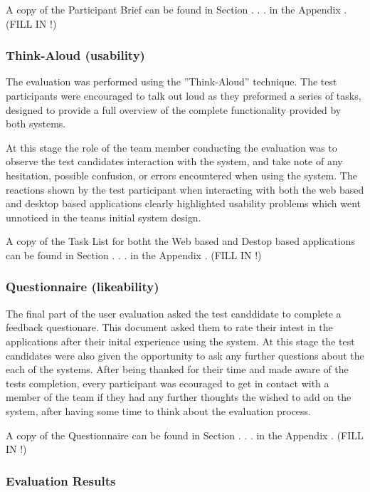 A copy of the Participant Brief can be found in Section . . .  in the Appendix . (FILL IN !) 

\subsubsection{Think-Aloud (usability) }

The evaluation was performed using the ”Think-Aloud” technique. The test participants were encouraged to talk out loud as they preformed a series of tasks, designed to provide a full overview of the complete functionality provided by both systems. 

At this stage the role of the team member conducting the evaluation was to observe the test candidates interaction with the system, and take note of any hesitation, possible confusion, or errors encountered when using the system. The reactions shown by the test participant when interacting with both the web based and desktop based applications clearly highlighted usability problems which went unnoticed in the teams initial system design. 

A copy of the Task List for botht the Web based and Destop based applications can be found in Section . . .  in the Appendix . (FILL IN !) 

\subsubsection{Questionnaire (likeability)}

The final part of the user evaluation asked the test canddidate to complete a feedback questionare. This document asked them to rate their intest in the applications after their inital experience using the system. At this stage the test candidates were also given the opportunity to ask any further questions about the each of the systems. After being thanked for their time and made aware of the tests completion, every participant was ecouraged to get in contact with a member of the team if they had any further thoughts the wished to add on the system, after having some time to think about the evaluation process.    

A copy of the Questionnaire can be found in Section . . .  in the Appendix . (FILL IN !) 


\subsubsection{Evaluation Results}

